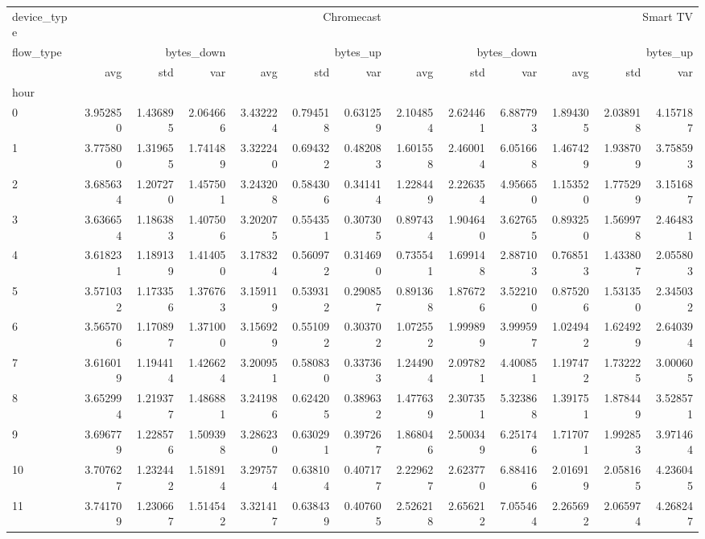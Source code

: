 \begin{tabular}{lrrrrrrrrrrrr}
\toprule
device_type & \multicolumn{6}{r}{Chromecast} & \multicolumn{6}{r}{Smart TV} \\
flow_type & \multicolumn{3}{r}{bytes_down} & \multicolumn{3}{r}{bytes_up} & \multicolumn{3}{r}{bytes_down} & \multicolumn{3}{r}{bytes_up} \\
 & avg & std & var & avg & std & var & avg & std & var & avg & std & var \\
hour &  &  &  &  &  &  &  &  &  &  &  &  \\
\midrule
0 & 3.952850 & 1.436895 & 2.064666 & 3.432224 & 0.794518 & 0.631259 & 2.104854 & 2.624461 & 6.887793 & 1.894305 & 2.038918 & 4.157187 \\
1 & 3.775800 & 1.319655 & 1.741489 & 3.322240 & 0.694322 & 0.482083 & 1.601558 & 2.460014 & 6.051668 & 1.467429 & 1.938709 & 3.758593 \\
2 & 3.685634 & 1.207270 & 1.457501 & 3.243208 & 0.584306 & 0.341414 & 1.228449 & 2.226354 & 4.956650 & 1.153520 & 1.775299 & 3.151687 \\
3 & 3.636654 & 1.186383 & 1.407506 & 3.202075 & 0.554351 & 0.307305 & 0.897434 & 1.904640 & 3.627655 & 0.893250 & 1.569978 & 2.464831 \\
4 & 3.618231 & 1.189139 & 1.414050 & 3.178324 & 0.560972 & 0.314690 & 0.735541 & 1.699148 & 2.887103 & 0.768513 & 1.433807 & 2.055803 \\
5 & 3.571032 & 1.173356 & 1.376763 & 3.159119 & 0.539312 & 0.290857 & 0.891368 & 1.876726 & 3.522100 & 0.875206 & 1.531350 & 2.345032 \\
6 & 3.565706 & 1.170897 & 1.371000 & 3.156929 & 0.551092 & 0.303702 & 1.072552 & 1.999899 & 3.999597 & 1.024942 & 1.624929 & 2.640394 \\
7 & 3.616019 & 1.194414 & 1.426624 & 3.200951 & 0.580830 & 0.337363 & 1.244904 & 2.097821 & 4.400851 & 1.197472 & 1.732225 & 3.000605 \\
8 & 3.652994 & 1.219377 & 1.486881 & 3.241986 & 0.624205 & 0.389632 & 1.477639 & 2.307351 & 5.323868 & 1.391751 & 1.878449 & 3.528571 \\
9 & 3.696779 & 1.228576 & 1.509398 & 3.286230 & 0.630291 & 0.397267 & 1.868046 & 2.500349 & 6.251746 & 1.717071 & 1.992853 & 3.971464 \\
10 & 3.707627 & 1.232442 & 1.518914 & 3.297574 & 0.638104 & 0.407177 & 2.229627 & 2.623770 & 6.884166 & 2.016919 & 2.058165 & 4.236045 \\
11 & 3.741709 & 1.230667 & 1.514542 & 3.321417 & 0.638439 & 0.407605 & 2.526218 & 2.656212 & 7.055464 & 2.265692 & 2.065974 & 4.268247 \\

\end{tabular}
